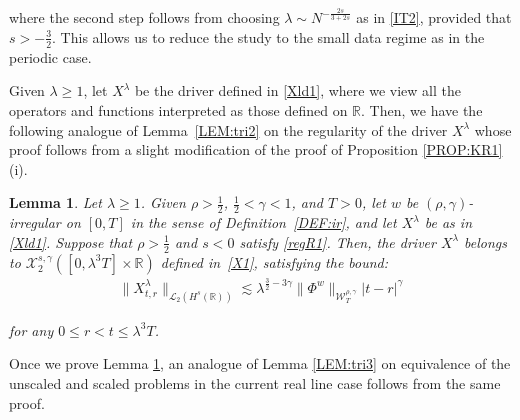 \documentclass[letterpaper, 11pt,  reqno]{amsart}
\newtheorem{lemma}[theorem]{Lemma}
\newcommand{\1}{\hspace{0.5mm}\text{I}\hspace{0.5mm}}
\newcommand{\noi}{\noindent}
\newcommand{\R}{\mathbb{R}}
\newcommand{\g}{\gamma}
\newcommand{\ld}{\lambda}
\newcommand{\les}{\lesssim}
\newcommand{\cL}{\mathcal{L}}
\newcommand{\cX}{\mathcal{X}}
\newcommand{\W}{\mathcal{W}}
\numberwithin{equation}{section}
\numberwithin{theorem}{section}
\begin{document}
\noi
where the second step 
follows from choosing 
$\ld \sim N^{-\frac{2s}{3+2s}}$ as in \eqref{IT2}, 
provided that $s > -\frac 32$.
This allows us to reduce the study to the small data regime
as in the periodic case.




Given $\ld \ge 1$, let $X^\ld$ be the driver defined in \eqref{Xld1}, 
where we view all the operators and functions 
interpreted as those defined on $\R$.
Then, we have the following 
analogue of Lemma~\ref{LEM:tri2}
on the regularity of the driver $X^\ld$ 
whose proof follows
from a slight modification of the proof of 
Proposition \ref{PROP:KR1}\,(i).


\begin{lemma}
\label{LEM:Rtri2}
Let $\ld \ge 1$.
Given $\rho > \frac 12$, $\frac 12 < \g < 1$, and $T> 0$, 
let  $w$ be $(\rho,\g)$-irregular on $[0, T]$ in the sense of Definition~\ref{DEF:ir}, 
and let $X^\ld$ be as in \eqref{Xld1}.
Suppose that $\rho > \frac 12$ and $s <  0$
satisfy 
\eqref{regR1}.
Then, 
the driver $X^\ld$ 
belongs to $  \cX^{s, \g}_2([0, \ld^3T] \times \R)$ defined in~\eqref{X1}, 
satisfying the bound\textup{:}
 \begin{align*}
 \| X^{\ld}_{t,r}  \|_{\cL_2 ( H^s(\R)) }
 \les
 \ld^{ \frac32 -3\g} 
  \|\Phi^{w}\|_{\W_{T}^{\rho, \g}}
 |t-r|^{\g}
\end{align*}


\noi
for any $0\leq r<t \leq \ld^3T $.

\end{lemma}


Once we prove Lemma \ref{LEM:Rtri2}, 
an analogue of Lemma \ref{LEM:tri3} 
on  equivalence of the 
unscaled and scaled problems in the current real line case follows
from the same proof.
\end{document}

